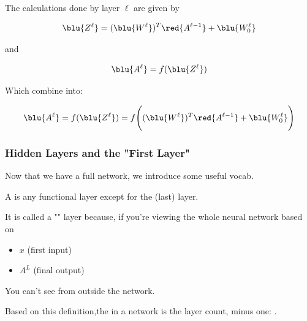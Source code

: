         \begin{kequation}
            The calculations done by layer $\ell$ are given by
            
            \begin{equation*}
                \blu{Z^\ell} = (\blu{W^\ell})^T \red{A^{\ell-1}} + \blu{W_0^\ell} 
            \end{equation*}
            
            and
            
            \begin{equation*}
                \blu{A^\ell} = f(\blu{Z^\ell})
            \end{equation*}
            
            Which combine into:
            
            \begin{equation*}
                \blu{A^\ell} = f(\blu{Z^\ell}) = 
                f  
                \Bigg( 
                    (\blu{W^\ell})^T \red{A^{\ell-1}} + \blu{W_0^\ell} 
                \Bigg)
            \end{equation*}
        \end{kequation}

    \subsubsection*{Hidden Layers and the "First Layer"}
        
        Now that we have a full network, we introduce some useful vocab.\\
        
        \begin{definition}
            A  is any functional layer except for the  (last) layer.
            
            It is called a "" layer because, if you're viewing the whole neural network based on
            
            \begin{itemize}
                \item {} $x$ (first input)
                
                \item {} $A^L$ (final output)
            \end{itemize}
            
            You can't see  from outside the network.

            Based on this definition,the  in a network is the layer count, minus one: .
        \end{definition}
        
